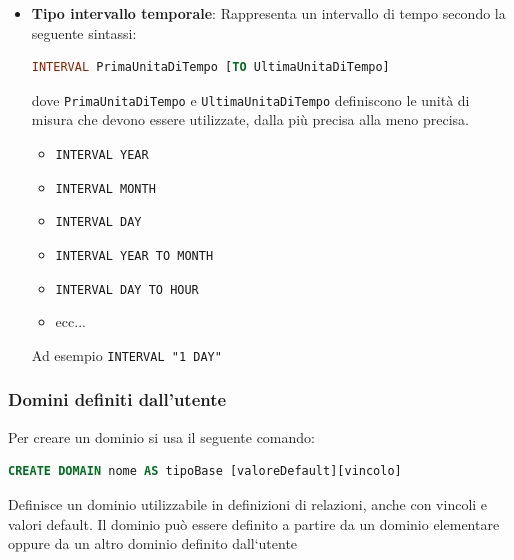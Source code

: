 \documentclass[a4paper,twoside]{article}
\begin{document}
\begin{itemize}
\begin{itemize}
      \item 
\begin{lstlisting}[language=SQL, numbers=none]
TIMESTAMP [(precisione)][WITH TIME ZONE]
\end{lstlisting}
Equivale a \texttt{DATE} + \texttt{TIME}.
    \end{itemize}

  \item \textbf{Tipo intervallo temporale}:
    Rappresenta un intervallo di tempo secondo la seguente sintassi:
\begin{lstlisting}[language=SQL, numbers=none]
INTERVAL PrimaUnitaDiTempo [TO UltimaUnitaDiTempo]
\end{lstlisting}
    dove \texttt{PrimaUnitaDiTempo} e \texttt{UltimaUnitaDiTempo} definiscono le
    unità di misura che devono essere utilizzate, dalla più precisa alla meno precisa.
    \begin{itemize}
      \item \texttt{INTERVAL YEAR}
      \item \texttt{INTERVAL MONTH}
      \item \texttt{INTERVAL DAY}
      \item \texttt{INTERVAL YEAR TO MONTH}
      \item \texttt{INTERVAL DAY TO HOUR}
      \item ecc...
    \end{itemize}
    Ad esempio \texttt{INTERVAL "1 DAY"}
\end{itemize}

\subsubsection{Domini definiti dall'utente}
Per creare un dominio si usa il seguente comando:
\begin{lstlisting}[language=SQL]
CREATE DOMAIN nome AS tipoBase [valoreDefault][vincolo]
\end{lstlisting}
Definisce un dominio utilizzabile in definizioni di relazioni, anche con vincoli
e valori default.
Il dominio può essere definito a partire da un dominio elementare oppure da un altro
dominio definito dall‘utente

\vspace{2em}
\noindent
\end{document}
